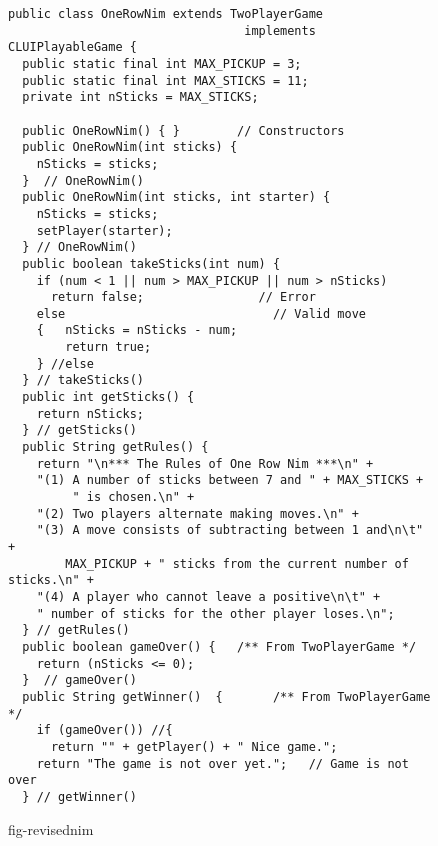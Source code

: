 \begin{figure}[h!]
\jjjprogstart
\begin{jjjlisting}[32pc]
\begin{lstlisting}
public class OneRowNim extends TwoPlayerGame 
                                 implements CLUIPlayableGame {   
  public static final int MAX_PICKUP = 3;
  public static final int MAX_STICKS = 11;
  private int nSticks = MAX_STICKS;

  public OneRowNim() { }        // Constructors
  public OneRowNim(int sticks) {   
    nSticks = sticks;
  }  // OneRowNim()
  public OneRowNim(int sticks, int starter) {   
    nSticks = sticks;
    setPlayer(starter);
  } // OneRowNim()
  public boolean takeSticks(int num) {   
    if (num < 1 || num > MAX_PICKUP || num > nSticks) 
      return false;                // Error
    else                             // Valid move
    {   nSticks = nSticks - num;
        return true;
    } //else
  } // takeSticks()
  public int getSticks() {   
    return nSticks;
  } // getSticks()
  public String getRules() {
    return "\n*** The Rules of One Row Nim ***\n" +
    "(1) A number of sticks between 7 and " + MAX_STICKS + 
         " is chosen.\n" + 
    "(2) Two players alternate making moves.\n" + 
    "(3) A move consists of subtracting between 1 and\n\t" + 
        MAX_PICKUP + " sticks from the current number of sticks.\n" + 
    "(4) A player who cannot leave a positive\n\t" + 
    " number of sticks for the other player loses.\n";
  } // getRules()
  public boolean gameOver() {   /** From TwoPlayerGame */
    return (nSticks <= 0);
  }  // gameOver()
  public String getWinner()  {       /** From TwoPlayerGame */
    if (gameOver()) //{
      return "" + getPlayer() + " Nice game.";
    return "The game is not over yet.";   // Game is not over
  } // getWinner()
\end{lstlisting}
\end{jjjlisting}
{fig-revisednim}
\end{figure}

